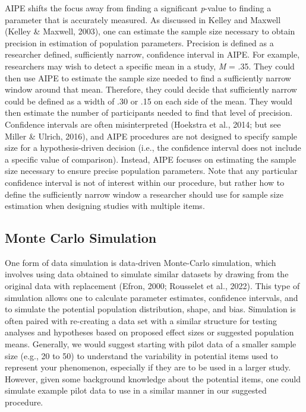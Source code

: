 \documentclass[
  man]{apa7}
\begin{document}
AIPE shifts the focus away from finding a significant \emph{p}-value to finding a parameter that is accurately measured. As discussed in Kelley and Maxwell (Kelley \& Maxwell, 2003), one can estimate the sample size necessary to obtain precision in estimation of population parameters. Precision is defined as a researcher defined, sufficiently narrow, confidence interval in AIPE. For example, researchers may wish to detect a specific mean in a study, \emph{M} = .35. They could then use AIPE to estimate the sample size needed to find a sufficiently narrow window around that mean. Therefore, they could decide that sufficiently narrow could be defined as a width of .30 or .15 on each side of the mean. They would then estimate the number of participants needed to find that level of precision. Confidence intervals are often misinterpreted (Hoekstra et al., 2014; but see Miller \& Ulrich, 2016), and AIPE procedures are not designed to specify sample size for a hypothesis-driven decision (i.e., the confidence interval does not include a specific value of comparison). Instead, AIPE focuses on estimating the sample size necessary to ensure precise population parameters. Note that any particular confidence interval is not of interest within our procedure, but rather how to define the sufficiently narrow window a researcher should use for sample size estimation when designing studies with multiple items.

\subsection{Monte Carlo Simulation}\label{monte-carlo-simulation}

One form of data simulation is data-driven Monte-Carlo simulation, which involves using data obtained to simulate similar datasets by drawing from the original data with replacement (Efron, 2000; Rousselet et al., 2022). This type of simulation allows one to calculate parameter estimates, confidence intervals, and to simulate the potential population distribution, shape, and bias. Simulation is often paired with re-creating a data set with a similar structure for testing analyses and hypotheses based on proposed effect sizes or suggested population means. Generally, we would suggest starting with pilot data of a smaller sample size (e.g., 20 to 50) to understand the variability in potential items used to represent your phenomenon, especially if they are to be used in a larger study. However, given some background knowledge about the potential items, one could simulate example pilot data to use in a similar manner in our suggested procedure.
\end{document}
